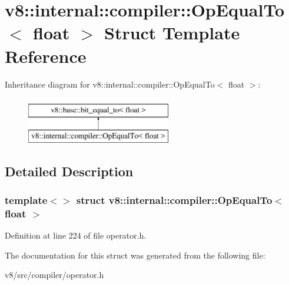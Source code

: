 \hypertarget{structv8_1_1internal_1_1compiler_1_1OpEqualTo_3_01float_01_4}{}\section{v8\+:\+:internal\+:\+:compiler\+:\+:Op\+Equal\+To$<$ float $>$ Struct Template Reference}
\label{structv8_1_1internal_1_1compiler_1_1OpEqualTo_3_01float_01_4}
Inheritance diagram for v8\+:\+:internal\+:\+:compiler\+:\+:Op\+Equal\+To$<$ float $>$\+:\begin{figure}[H]
\begin{center}
\leavevmode
\includegraphics[height=2.000000cm]{structv8_1_1internal_1_1compiler_1_1OpEqualTo_3_01float_01_4}
\end{center}
\end{figure}


\subsection{Detailed Description}
\subsubsection*{template$<$$>$\newline
struct v8\+::internal\+::compiler\+::\+Op\+Equal\+To$<$ float $>$}



Definition at line 224 of file operator.\+h.



The documentation for this struct was generated from the following file\+:\begin{DoxyCompactItemize}
\item 
v8/src/compiler/operator.\+h\end{DoxyCompactItemize}
